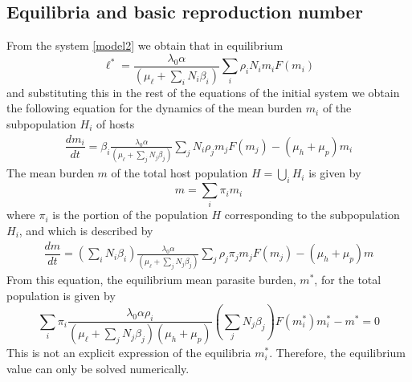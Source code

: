 \documentclass[eng]{MMSB-class-eng}
\begin{document}
\subsection{Equilibria and basic reproduction number} 
From the system \eqref{model2} we obtain that in equilibrium
\begin{equation}
\ell^*=\frac{  \lambda_0 \alpha }{(\mu_{\ell}+\sum_i N_i \beta_i  )}   \sum_i \rho_{i} N_{i} m_{i} F(m_{i}) 
\end{equation} 
and substituting this in the rest of the equations of the initial system we obtain the following equation for the dynamics of the mean burden $m_{i}$ of the subpopulation $H_{i}$ of hosts
\begin{equation}
\begin{split}
\dfrac{dm_{i}}{dt}=\beta_{i} \frac{\lambda_0\alpha}{ (\mu_{\ell}+\sum_j N_j \beta_j  ) }  
\sum_j    N_i \rho_{j}  m_{j} F(m_{j})  - (\mu_h+\mu_p) m_{i}%
\end{split}
\end{equation}
The mean burden $m$ of the total host population $H=\bigcup_i H_i$ is given by
\begin{equation}
m=\sum_i \pi_i m_{i} 
\end{equation}
where $\pi_i$ is the portion of the population $H$ corresponding to the subpopulation $H_i$, and which is described by
\begin{equation}
\begin{split}
\dfrac{dm}{dt}= \left( \sum_i N_i \beta_{i} \right)  
\frac{ \lambda_0 \alpha }{(\mu_{\ell}+\sum_j N_j \beta_j  )}  
\sum_j \rho_{j} \pi_{j} m_{j} F(m_{j})   -(\mu_{h}+\mu_p) m%
\end{split}
\end{equation}
From this equation, the equilibrium mean parasite burden, $m^*$, for the total population is given by
\begin{equation}
\sum_i \pi_i \frac{ \lambda_0 \alpha \rho_{i}}{ (\mu_{\ell}+\sum_j N_j \beta_j  )(\mu_{h}+\mu_p)} 
\left( \sum_j N_{j} \beta_{j} \right) F( m^*_{i}) m^*_{i} - m^*=0 
\end{equation}
This is not an explicit expression of the equilibria $m_{i}^*$. Therefore, the equilibrium value can only be solved numerically.
\end{document}
